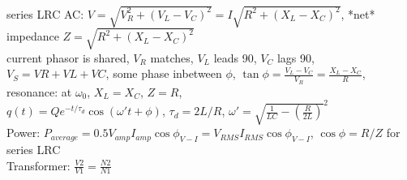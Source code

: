 \documentclass{article}
\begin{document}
\begin{large}
\\series LRC AC: $V=\sqrt{V_R^2+(V_L-V_C)^2}=I\sqrt{R^2+(X_L-X_C)^2}$, *net* impedance $Z=\sqrt{R^2+(X_L-X_C)^2}$
\\current phasor is shared, $V_R$ matches, $V_L$ leads 90, $V_C$ lags 90, $V_S=VR+VL+VC$, some phase inbetween $\phi$, $\tan\phi=\frac{V_L-V_C}{V_R}=\frac{X_L-X_C}{R}$, resonance: at $\omega_0$, $X_L=X_C$, $Z=R$, 
\\$q(t)=Qe^{-t/\tau_d}\cos(\omega't+\phi)$, $\tau_d=2L/R$, $\omega'=\sqrt{\frac{1}{LC}-(\frac{R}{2L})}^2$
\\Power: $P_{average}=0.5V_{amp}I_{amp}\cos\phi_{V-I}=V_{RMS}I_{RMS}\cos\phi_{V-I}$, $\cos\phi=R/Z$ for series LRC
\\Transformer: $\frac{V2}{V1}=\frac{N2}{N1}$

\end{large}
\end{document}
